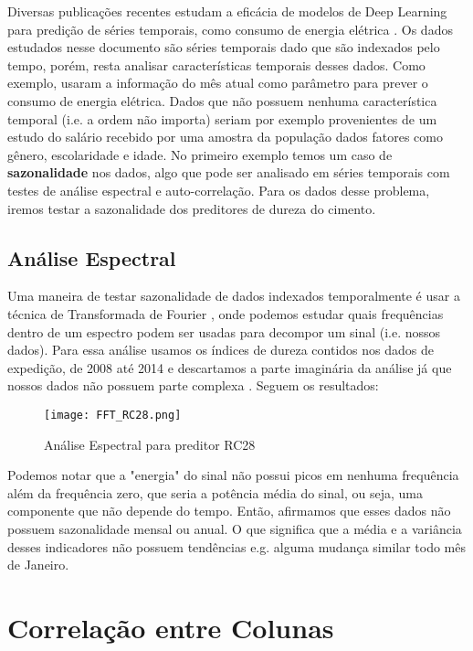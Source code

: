 Diversas publicações recentes estudam a eficácia de modelos de Deep Learning
para predição de séries temporais, como consumo de energia elétrica
\citep{lstmbr}. Os dados estudados nesse documento são séries temporais dado que
são indexados pelo tempo, porém, resta analisar características temporais desses
dados. Como exemplo, \cite{lstmbr} usaram a informação do mês atual como
parâmetro para prever o consumo de energia elétrica. Dados que não possuem nenhuma característica temporal (i.e. a ordem não importa) seriam por exemplo provenientes de um estudo do salário recebido por uma amostra da população dados fatores como gênero, escolaridade e idade. No primeiro exemplo temos um caso de \textbf{sazonalidade} nos dados, algo que pode ser analisado em séries temporais com testes de análise espectral e auto-correlação. Para os dados desse problema, iremos testar a sazonalidade dos preditores de dureza do cimento.

\subsection{Análise Espectral}

Uma maneira de testar sazonalidade de dados indexados temporalmente é usar a
técnica de Transformada de Fourier \citep{spec}, onde podemos estudar quais
frequências dentro de um espectro podem ser usadas para decompor um sinal (i.e.
nossos dados). Para essa análise usamos os índices de dureza contidos nos dados
de expedição, de 2008 até 2014 e descartamos a parte imaginária da análise já
que nossos dados não possuem parte complexa \citep{spec}. Seguem os resultados:

\begin{figure}[H]
\centering
\texttt{[image: FFT\_RC28.png]}
\caption{Análise Espectral para preditor RC28}
\end{figure}


Podemos notar que a "energia" do sinal não possui picos em nenhuma frequência além da frequência zero, que seria a potência média do sinal, ou seja, uma componente que não depende do tempo. Então, afirmamos que esses dados não possuem sazonalidade mensal ou anual. O que significa que a média e a variância desses indicadores não possuem tendências e.g. alguma mudança similar todo mês de Janeiro.


\section{Correlação entre Colunas}


